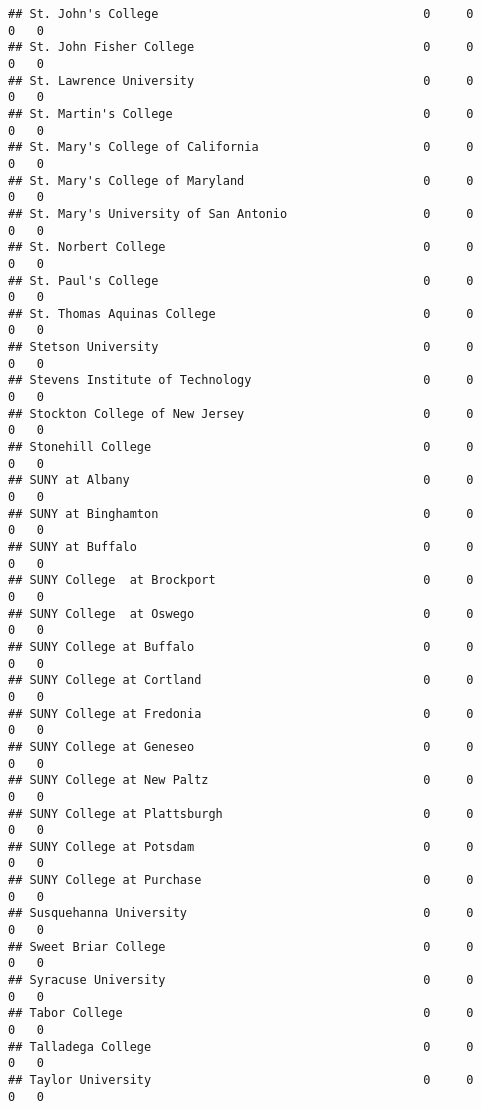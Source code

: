 \documentclass[
]{article}
\begin{document}
\begin{verbatim}
## St. John's College                                     0     0        0   0
## St. John Fisher College                                0     0        0   0
## St. Lawrence University                                0     0        0   0
## St. Martin's College                                   0     0        0   0
## St. Mary's College of California                       0     0        0   0
## St. Mary's College of Maryland                         0     0        0   0
## St. Mary's University of San Antonio                   0     0        0   0
## St. Norbert College                                    0     0        0   0
## St. Paul's College                                     0     0        0   0
## St. Thomas Aquinas College                             0     0        0   0
## Stetson University                                     0     0        0   0
## Stevens Institute of Technology                        0     0        0   0
## Stockton College of New Jersey                         0     0        0   0
## Stonehill College                                      0     0        0   0
## SUNY at Albany                                         0     0        0   0
## SUNY at Binghamton                                     0     0        0   0
## SUNY at Buffalo                                        0     0        0   0
## SUNY College  at Brockport                             0     0        0   0
## SUNY College  at Oswego                                0     0        0   0
## SUNY College at Buffalo                                0     0        0   0
## SUNY College at Cortland                               0     0        0   0
## SUNY College at Fredonia                               0     0        0   0
## SUNY College at Geneseo                                0     0        0   0
## SUNY College at New Paltz                              0     0        0   0
## SUNY College at Plattsburgh                            0     0        0   0
## SUNY College at Potsdam                                0     0        0   0
## SUNY College at Purchase                               0     0        0   0
## Susquehanna University                                 0     0        0   0
## Sweet Briar College                                    0     0        0   0
## Syracuse University                                    0     0        0   0
## Tabor College                                          0     0        0   0
## Talladega College                                      0     0        0   0
## Taylor University                                      0     0        0   0

\end{verbatim}
\end{document}
